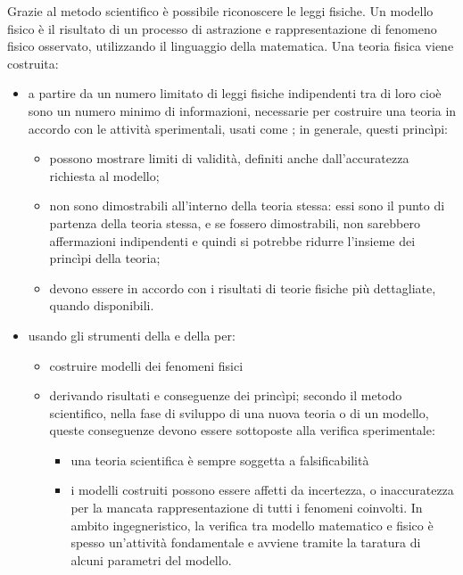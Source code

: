 \documentclass[letterpaper,10pt,italian]{jupyterBook}
\begin{document}
\sphinxAtStartPar
{} Grazie al metodo scientifico è possibile riconoscere le leggi fisiche. Un modello fisico è il risultato di un processo di astrazione e rappresentazione di fenomeno fisico osservato, utilizzando il linguaggio della matematica. Una teoria fisica viene costruita:
\begin{itemize}
\item {} 
\sphinxAtStartPar
a partire da un numero limitato di leggi fisiche indipendenti tra di loro \sphinxhyphen{} cioè sono un numero minimo di informazioni, necessarie per costruire una teoria \sphinxhyphen{} in accordo con le attività sperimentali, usati come ; in generale, questi princìpi:
\begin{itemize}
\item {} 
\sphinxAtStartPar
possono mostrare limiti di validità, definiti anche dall’accuratezza richiesta al modello;

\item {} 
\sphinxAtStartPar
non sono dimostrabili all’interno della teoria stessa: essi sono il punto di partenza della teoria stessa, e se fossero dimostrabili, non sarebbero affermazioni indipendenti \sphinxhyphen{} e quindi si potrebbe ridurre l’insieme dei princìpi della teoria;

\item {} 
\sphinxAtStartPar
devono essere in accordo con i risultati di teorie fisiche più dettagliate, quando disponibili.

\end{itemize}

\item {} 
\sphinxAtStartPar
usando gli strumenti della  e della  per:
\begin{itemize}
\item {} 
\sphinxAtStartPar
costruire modelli dei fenomeni fisici

\item {} 
\sphinxAtStartPar
derivando risultati e conseguenze dei princìpi; secondo il metodo scientifico, nella fase di sviluppo di una nuova teoria o di un modello, queste conseguenze devono essere sottoposte alla verifica sperimentale:
\begin{itemize}
\item {} 
\sphinxAtStartPar
una teoria scientifica è sempre soggetta a falsificabilità

\item {} 
\sphinxAtStartPar
i modelli costruiti possono essere affetti da incertezza, o inaccuratezza per la mancata rappresentazione di tutti i fenomeni coinvolti. In ambito ingegneristico, la verifica tra modello matematico e fisico è spesso un’attività fondamentale e avviene tramite la taratura di alcuni parametri del modello.

\end{itemize}

\end{itemize}

\end{itemize}
\end{document}
